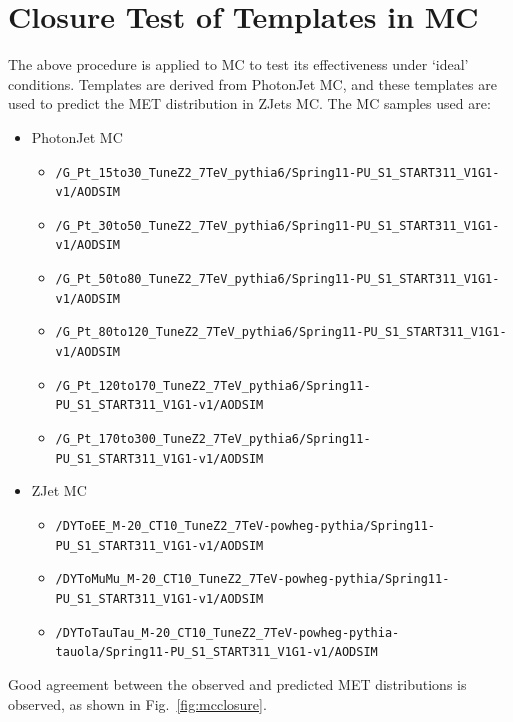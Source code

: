 
\section{Closure Test of Templates in MC}
\label{sec:mc}

The above procedure is applied to MC to test its effectiveness under `ideal' conditions. Templates are derived from PhotonJet MC, 
and these templates are used to predict the MET distribution in ZJets MC. The MC samples used are:
\begin{itemize}
\item PhotonJet MC
  \begin{itemize}
  \item \verb=/G_Pt_15to30_TuneZ2_7TeV_pythia6/Spring11-PU_S1_START311_V1G1-v1/AODSIM  =
  \item \verb=/G_Pt_30to50_TuneZ2_7TeV_pythia6/Spring11-PU_S1_START311_V1G1-v1/AODSIM  =
  \item \verb=/G_Pt_50to80_TuneZ2_7TeV_pythia6/Spring11-PU_S1_START311_V1G1-v1/AODSIM  =
  \item \verb=/G_Pt_80to120_TuneZ2_7TeV_pythia6/Spring11-PU_S1_START311_V1G1-v1/AODSIM =
  \item \verb=/G_Pt_120to170_TuneZ2_7TeV_pythia6/Spring11-PU_S1_START311_V1G1-v1/AODSIM=
  \item \verb=/G_Pt_170to300_TuneZ2_7TeV_pythia6/Spring11-PU_S1_START311_V1G1-v1/AODSIM= 	  
  \end{itemize}
\item ZJet MC
  \begin{itemize}
  \item \verb=/DYToEE_M-20_CT10_TuneZ2_7TeV-powheg-pythia/Spring11-PU_S1_START311_V1G1-v1/AODSIM=
  \item \verb=/DYToMuMu_M-20_CT10_TuneZ2_7TeV-powheg-pythia/Spring11-PU_S1_START311_V1G1-v1/AODSIM=
  \item \verb=/DYToTauTau_M-20_CT10_TuneZ2_7TeV-powheg-pythia-tauola/Spring11-PU_S1_START311_V1G1-v1/AODSIM=
  \end{itemize}
\end{itemize}

Good agreement between the observed and predicted MET distributions is observed, as shown in Fig.~\ref{fig:mcclosure}.

